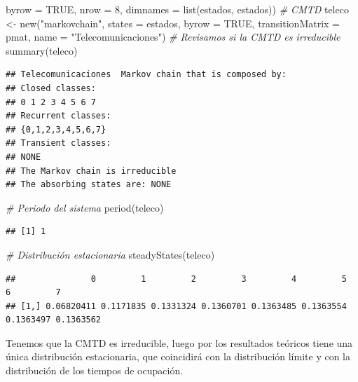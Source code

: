 \documentclass[
]{book}
\newenvironment{Shaded}{\begin{snugshade}}{\end{snugshade}}
\newcommand{\AttributeTok}[1]{\textcolor[rgb]{0.77,0.63,0.00}{#1}}
\newcommand{\CommentTok}[1]{\textcolor[rgb]{0.56,0.35,0.01}{\textit{#1}}}
\newcommand{\ConstantTok}[1]{\textcolor[rgb]{0.00,0.00,0.00}{#1}}
\newcommand{\DecValTok}[1]{\textcolor[rgb]{0.00,0.00,0.81}{#1}}
\newcommand{\FunctionTok}[1]{\textcolor[rgb]{0.00,0.00,0.00}{#1}}
\newcommand{\NormalTok}[1]{#1}
\newcommand{\OtherTok}[1]{\textcolor[rgb]{0.56,0.35,0.01}{#1}}
\newcommand{\StringTok}[1]{\textcolor[rgb]{0.31,0.60,0.02}{#1}}
\theoremstyle{definition}
\theoremstyle{definition}
\theoremstyle{definition}
\theoremstyle{definition}
\theoremstyle{remark}
\begin{document}
\begin{Shaded}
\begin{Highlighting}[]
               \AttributeTok{byrow =} \ConstantTok{TRUE}\NormalTok{, }\AttributeTok{nrow =} \DecValTok{8}\NormalTok{, }
               \AttributeTok{dimnames =} \FunctionTok{list}\NormalTok{(estados, estados))}
\CommentTok{\# CMTD}
\NormalTok{teleco }\OtherTok{\textless{}{-}} \FunctionTok{new}\NormalTok{(}\StringTok{"markovchain"}\NormalTok{, }\AttributeTok{states =}\NormalTok{ estados, }
                 \AttributeTok{byrow =} \ConstantTok{TRUE}\NormalTok{, }\AttributeTok{transitionMatrix =}\NormalTok{ pmat, }
              \AttributeTok{name =} \StringTok{"Telecomunicaciones"}\NormalTok{)}
\CommentTok{\# Revisamos si la CMTD es irreducible}
\FunctionTok{summary}\NormalTok{(teleco)}
\end{Highlighting}
\end{Shaded}

\begin{verbatim}
## Telecomunicaciones  Markov chain that is composed by: 
## Closed classes: 
## 0 1 2 3 4 5 6 7 
## Recurrent classes: 
## {0,1,2,3,4,5,6,7}
## Transient classes: 
## NONE 
## The Markov chain is irreducible 
## The absorbing states are: NONE
\end{verbatim}

\begin{Shaded}
\begin{Highlighting}[]
\CommentTok{\# Periodo del sistema}
\FunctionTok{period}\NormalTok{(teleco)}
\end{Highlighting}
\end{Shaded}

\begin{verbatim}
## [1] 1
\end{verbatim}

\begin{Shaded}
\begin{Highlighting}[]
\CommentTok{\# Distribución estacionaria}
\FunctionTok{steadyStates}\NormalTok{(teleco)}
\end{Highlighting}
\end{Shaded}

\begin{verbatim}
##               0         1         2         3         4         5         6         7
## [1,] 0.06820411 0.1171835 0.1331324 0.1360701 0.1363485 0.1363554 0.1363497 0.1363562
\end{verbatim}

Tenemos que la CMTD es irreducible, luego por los resultados teóricos tiene una única distribución estacionaria, que coincidirá con la distribución límite y con la distribución de los tiempos de ocupación.
\end{document}
